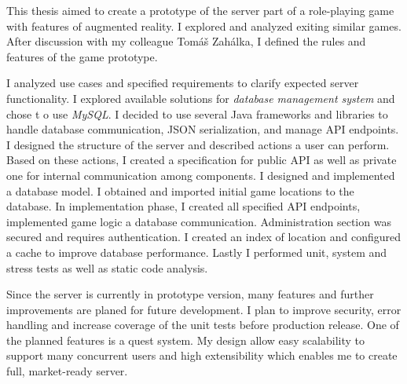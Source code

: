 This thesis aimed to create a prototype of the server part of a role-playing game with features of augmented reality. I explored and analyzed exiting similar games. After discussion with my colleague Tomáš Zahálka, I defined the rules and features of the game prototype. 

I analyzed use cases and specified requirements to clarify expected server functionality. I explored available solutions for \textit{database management system} and chose t o use \textit{MySQL}. I decided to use several Java frameworks and libraries to handle database communication, JSON serialization, and manage API endpoints. I designed the structure of the server and described actions a user can perform. Based on these actions, I created a specification for public API as well as private one for internal communication among components. I designed and implemented a database model. I obtained and imported initial game locations to the database. In implementation phase, I created all specified API endpoints, implemented game logic a database communication. Administration section was secured and requires authentication. I created an index of location and configured a cache to improve database performance. Lastly I performed unit, system  and stress tests as well as static code analysis.

Since the server is currently in prototype version, many features and further improvements are planed for future development. I plan to improve security, error handling and increase coverage of the unit tests before production release. One of the planned features is a quest system. My design allow easy scalability to support many concurrent users and high extensibility which enables me to create full, market-ready server.